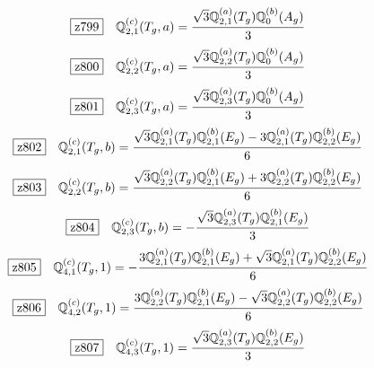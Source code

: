 \documentclass[fleqn,10pt,landscape]{jsarticle}
\begin{document}
\begin{dmath*}
\hspace*{3mm}\fbox{z799}\quad \mathbb{Q}_{2,1}^{(c)}(T_{g},a)=\frac{\sqrt{3} \mathbb{Q}_{2,1}^{(a)}(T_{g}) \mathbb{Q}_{0}^{(b)}(A_{g})}{3}
\end{dmath*}
\begin{dmath*}
\hspace*{3mm}\fbox{z800}\quad \mathbb{Q}_{2,2}^{(c)}(T_{g},a)=\frac{\sqrt{3} \mathbb{Q}_{2,2}^{(a)}(T_{g}) \mathbb{Q}_{0}^{(b)}(A_{g})}{3}
\end{dmath*}
\begin{dmath*}
\hspace*{3mm}\fbox{z801}\quad \mathbb{Q}_{2,3}^{(c)}(T_{g},a)=\frac{\sqrt{3} \mathbb{Q}_{2,3}^{(a)}(T_{g}) \mathbb{Q}_{0}^{(b)}(A_{g})}{3}
\end{dmath*}
\begin{dmath*}
\hspace*{3mm}\fbox{z802}\quad \mathbb{Q}_{2,1}^{(c)}(T_{g},b)=\frac{\sqrt{3} \mathbb{Q}_{2,1}^{(a)}(T_{g}) \mathbb{Q}_{2,1}^{(b)}(E_{g}) - 3 \mathbb{Q}_{2,1}^{(a)}(T_{g}) \mathbb{Q}_{2,2}^{(b)}(E_{g})}{6}
\end{dmath*}
\begin{dmath*}
\hspace*{3mm}\fbox{z803}\quad \mathbb{Q}_{2,2}^{(c)}(T_{g},b)=\frac{\sqrt{3} \mathbb{Q}_{2,2}^{(a)}(T_{g}) \mathbb{Q}_{2,1}^{(b)}(E_{g}) + 3 \mathbb{Q}_{2,2}^{(a)}(T_{g}) \mathbb{Q}_{2,2}^{(b)}(E_{g})}{6}
\end{dmath*}
\begin{dmath*}
\hspace*{3mm}\fbox{z804}\quad \mathbb{Q}_{2,3}^{(c)}(T_{g},b)=- \frac{\sqrt{3} \mathbb{Q}_{2,3}^{(a)}(T_{g}) \mathbb{Q}_{2,1}^{(b)}(E_{g})}{3}
\end{dmath*}
\begin{dmath*}
\hspace*{3mm}\fbox{z805}\quad \mathbb{Q}_{4,1}^{(c)}(T_{g},1)=- \frac{3 \mathbb{Q}_{2,1}^{(a)}(T_{g}) \mathbb{Q}_{2,1}^{(b)}(E_{g}) + \sqrt{3} \mathbb{Q}_{2,1}^{(a)}(T_{g}) \mathbb{Q}_{2,2}^{(b)}(E_{g})}{6}
\end{dmath*}
\begin{dmath*}
\hspace*{3mm}\fbox{z806}\quad \mathbb{Q}_{4,2}^{(c)}(T_{g},1)=\frac{3 \mathbb{Q}_{2,2}^{(a)}(T_{g}) \mathbb{Q}_{2,1}^{(b)}(E_{g}) - \sqrt{3} \mathbb{Q}_{2,2}^{(a)}(T_{g}) \mathbb{Q}_{2,2}^{(b)}(E_{g})}{6}
\end{dmath*}
\begin{dmath*}
\hspace*{3mm}\fbox{z807}\quad \mathbb{Q}_{4,3}^{(c)}(T_{g},1)=\frac{\sqrt{3} \mathbb{Q}_{2,3}^{(a)}(T_{g}) \mathbb{Q}_{2,2}^{(b)}(E_{g})}{3}
\end{dmath*}
\end{document}
